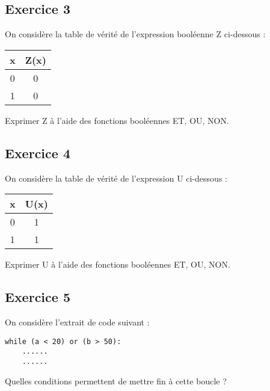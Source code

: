 \documentclass[11pt,a4paper]{article}
\begin{document}
\hypertarget{octicons-pencil-16-exercice-3}{%
\subsection*{\faPencil* Exercice
3}\label{octicons-pencil-16-exercice-3}}

On considère la table de vérité de l'expression booléenne Z ci-dessous :

\begin{longtable}[]{@{}cc@{}}
\toprule
x & Z(x)\tabularnewline
\midrule
\endhead
0 & 0\tabularnewline
1 & 0\tabularnewline
\bottomrule
\end{longtable}

Exprimer Z à l'aide des fonctions booléennes ET, OU, NON.

 

\hypertarget{octicons-pencil-16-exercice-4}{%
\subsection*{\faPencil* Exercice
4}\label{octicons-pencil-16-exercice-4}}

On considère la table de vérité de l'expression U ci-dessous :

\begin{longtable}[]{@{}cc@{}}
\toprule
x & U(x)\tabularnewline
\midrule
\endhead
0 & 1\tabularnewline
1 & 1\tabularnewline
\bottomrule
\end{longtable}

Exprimer U à l'aide des fonctions booléennes ET, OU, NON.

\newpage
 

\hypertarget{octicons-pencil-16-exercice-5}{%
\subsection*{\faPencil* Exercice
5}\label{octicons-pencil-16-exercice-5}}

On considère l'extrait de code suivant :

\begin{center}
\begin{minipage}{5cm}
  

\begin{lstlisting}
while (a < 20) or (b > 50):
    ......
    ......
\end{lstlisting}
\end{minipage}
\end{center}
Quelles conditions permettent de mettre fin à cette boucle ?
\end{document}
